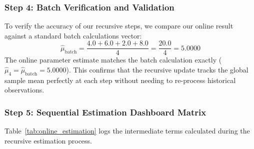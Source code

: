 \documentclass{article}
\begin{document}
\subsubsection{Step 4: Batch Verification and Validation}
To verify the accuracy of our recursive steps, we compare our online result against a standard batch calculations vector:
\begin{equation}
\hat{\mu}_{\text{batch}} = \frac{4.0 + 6.0 + 2.0 + 8.0}{4} = \frac{20.0}{4} = \mathbf{5.0000}
\end{equation}
The online parameter estimate matches the batch calculation exactly ($\hat{\mu}_4 = \hat{\mu}_{\text{batch}} = 5.0000$). This confirms that the recursive update tracks the global sample mean perfectly at each step without needing to re-process historical observations.

\subsubsection{Step 5: Sequential Estimation Dashboard Matrix}
Table~\ref{tab:online_estimation} logs the intermediate terms calculated during the recursive estimation process.

\begin{table}[htbp]
\centering
\small
{}
\caption{Sequential Metric Adjustments Tracking the Online Recursive Gaussian Mean}
\label{tab:online_estimation}
\end{table}
\end{document}
